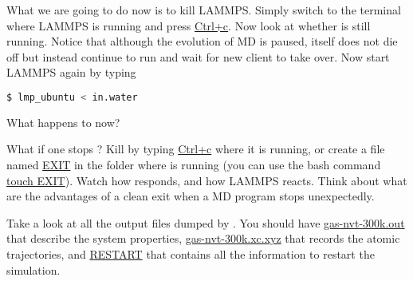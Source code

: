 \documentclass{article}
\begin{document}
\begin{Exercise}[label={i-pi},title={Molecular Dynamics: a client/server approach}]
\Question
What we are going to do now is to kill LAMMPS.
Simply switch to the terminal where LAMMPS is running and press \url{Ctrl+c}.
Now look at whether \ipi{} is still running.
Notice that although the evolution of MD is paused, \ipi{} itself does not die off but instead continue to run and wait for new client to take over.
Now start LAMMPS again by typing
\begin{lstlisting}[language=bash]
$ lmp_ubuntu < in.water
\end{lstlisting}
What happens to \ipi{} now?

\Question
What if one stops \ipi{}? 
Kill \ipi{} by typing \url{Ctrl+c} where it is running, or create a file named \url{EXIT} in the folder where \ipi{} is running
(you can use the bash command \url{touch EXIT}).
Watch how \ipi{} responds, and how LAMMPS reacts.
Think about what are the advantages of a clean exit when a MD program stops unexpectedly.

\Question
Take a look at all the output files dumped by \ipi{}.
You should have \url{gas-nvt-300k.out} that describe the system properties,
\url{gas-nvt-300k.xc.xyz} that records the atomic trajectories,
and \url{RESTART} that contains all the information to restart the simulation. 
\end{Exercise}
\end{document}
